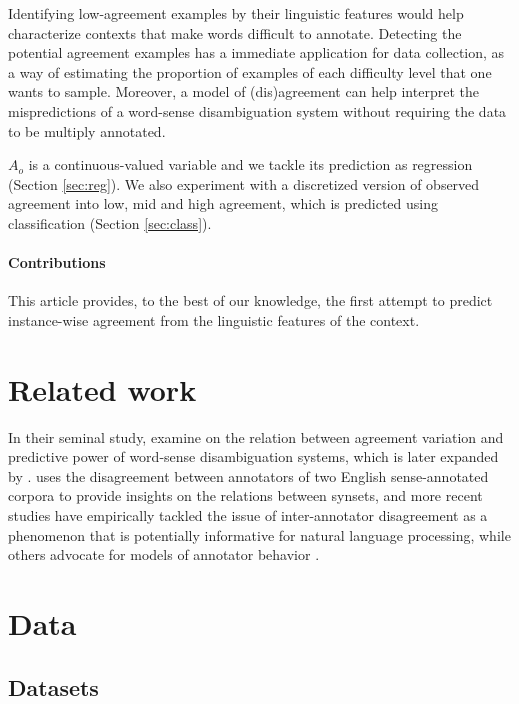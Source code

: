 \documentclass[11pt,a4paper]{article}
\begin{document}
Identifying low-agreement examples by their linguistic features would help characterize contexts that make words difficult to annotate. Detecting the potential agreement examples has a immediate application for data collection, as a way of estimating the proportion of examples of each difficulty level that one wants to sample. Moreover, a model of (dis)agreement can help interpret the mispredictions of a word-sense disambiguation system without requiring the data to be multiply annotated. 

$A_o$ is a continuous-valued variable and we tackle its prediction as regression (Section \ref{sec:reg}). We also experiment with a discretized version of observed agreement into low, mid and high agreement, which is predicted using classification (Section \ref{sec:class}).  

\paragraph{Contributions} This article provides, to the best of our knowledge, the first attempt to predict instance-wise agreement from the linguistic features of the context.
\section{Related work}
In their seminal study,  examine on the relation between agreement variation and predictive power of word-sense disambiguation systems, which is later expanded by .
 uses the disagreement between annotators of two English sense-annotated corpora to provide insights on the relations between synsets, and more recent studies \cite{Plank2014,Jurgens2013,Jurgens2014} have empirically tackled the issue of inter-annotator disagreement as a phenomenon that is potentially informative for natural language processing, while others advocate for models of annotator behavior \cite{Passonneau2014,Cohn2013}. 

\section{Data}
\subsection{Datasets}
\end{document}
